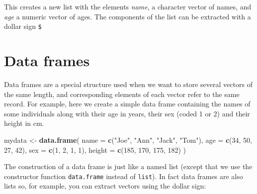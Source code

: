 \documentclass[
]{book}
\newenvironment{Shaded}{\begin{snugshade}}{\end{snugshade}}
\newcommand{\AttributeTok}[1]{\textcolor[rgb]{0.13,0.29,0.53}{#1}}
\newcommand{\DecValTok}[1]{\textcolor[rgb]{0.00,0.00,0.81}{#1}}
\newcommand{\FunctionTok}[1]{\textcolor[rgb]{0.13,0.29,0.53}{\textbf{#1}}}
\newcommand{\NormalTok}[1]{#1}
\newcommand{\OtherTok}[1]{\textcolor[rgb]{0.56,0.35,0.01}{#1}}
\newcommand{\SpecialCharTok}[1]{\textcolor[rgb]{0.81,0.36,0.00}{\textbf{#1}}}
\newcommand{\StringTok}[1]{\textcolor[rgb]{0.31,0.60,0.02}{#1}}
\begin{document}
This creates a new list with the elements \emph{name}, a character
vector of names, and \emph{age} a numeric vector of ages. The components
of the list can be extracted with a dollar sign \texttt{\$}

\begin{Shaded}
\end{Shaded}

\section{Data frames}\label{data-frames}

Data frames are a special structure used when we want to store several vectors of the
same length, and corresponding elements of each vector refer to the same record.
For example, here we create a simple data frame containing the names of some individuals
along with their age in years, their sex (coded 1 or 2) and their height in cm.

\begin{Shaded}
\begin{Highlighting}[]
\NormalTok{mydata }\OtherTok{\textless{}{-}} \FunctionTok{data.frame}\NormalTok{(}
  \AttributeTok{name =} \FunctionTok{c}\NormalTok{(}\StringTok{"Joe"}\NormalTok{, }\StringTok{"Ann"}\NormalTok{, }\StringTok{"Jack"}\NormalTok{, }\StringTok{"Tom"}\NormalTok{),}
  \AttributeTok{age =} \FunctionTok{c}\NormalTok{(}\DecValTok{34}\NormalTok{, }\DecValTok{50}\NormalTok{, }\DecValTok{27}\NormalTok{, }\DecValTok{42}\NormalTok{), }
  \AttributeTok{sex =} \FunctionTok{c}\NormalTok{(}\DecValTok{1}\NormalTok{, }\DecValTok{2}\NormalTok{, }\DecValTok{1}\NormalTok{, }\DecValTok{1}\NormalTok{),}
  \AttributeTok{height =} \FunctionTok{c}\NormalTok{(}\DecValTok{185}\NormalTok{, }\DecValTok{170}\NormalTok{, }\DecValTok{175}\NormalTok{, }\DecValTok{182}\NormalTok{)}
\NormalTok{)}
\end{Highlighting}
\end{Shaded}

The construction of a data frame is just like a named list (except
that we use the constructor function \texttt{data.frame} instead of \texttt{list}). In fact data frames are also lists so, for example, you can
extract vectors using the dollar sign:

\begin{Shaded}
\end{Shaded}
\end{document}
